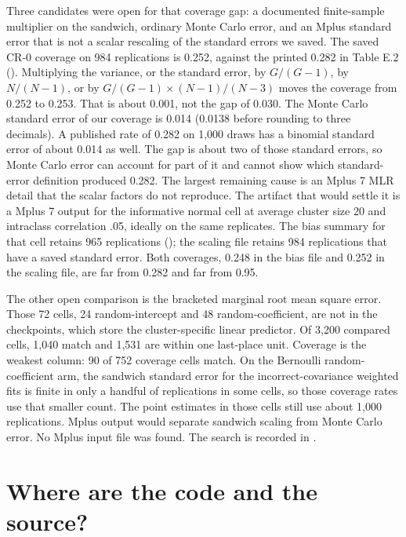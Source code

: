 Three candidates were open for that coverage gap: a documented finite-sample
multiplier on the sandwich, ordinary Monte Carlo error, and an Mplus standard
error that is not a scalar rescaling of the standard errors we saved.
The saved CR-0 coverage on 984 replications is 0.252, against the printed
0.282 in Table E.2
().
Multiplying the variance, or the standard error, by $G/(G-1)$, by
$N/(N-1)$, or by $G/(G-1)\times(N-1)/(N-3)$ moves the coverage from 0.252 to
0.253.
That is about 0.001, not the gap of 0.030.
The Monte Carlo standard error of our coverage is 0.014 (0.0138 before
rounding to three decimals).
A published rate of 0.282 on 1,000 draws has a binomial standard error of
about 0.014 as well.
The gap is about two of those standard errors, so Monte Carlo error can
account for part of it and cannot show which standard-error definition
produced 0.282.
The largest remaining cause is an Mplus 7 MLR detail that the scalar factors
do not reproduce.
The artifact that would settle it is a Mplus 7 output for the informative
normal cell at average cluster size 20 and intraclass correlation .05, ideally
on the same replicates.
The bias summary for that cell retains 965 replications
(); the scaling file retains 984
replications that have a saved standard error.
Both coverages, 0.248 in the bias file and 0.252 in the scaling file, are far
from 0.282 and far from 0.95.

The other open comparison is the bracketed marginal root mean square error.
Those 72 cells, 24 random-intercept and 48 random-coefficient, are not in the
checkpoints, which store the cluster-specific linear predictor.
Of 3,200 compared cells, 1,040 match and 1,531 are within one last-place unit.
Coverage is the weakest column: 90 of 752 coverage cells match.
On the Bernoulli random-coefficient arm, the sandwich standard error for the
incorrect-covariance weighted fits is finite in only a handful of replications
in some cells, so those coverage rates use that smaller count.
The point estimates in those cells still use about 1,000 replications.
Mplus output would separate sandwich scaling from Monte Carlo error.
No Mplus input file was found. The search is recorded in
.

\section{Where are the code and the source?}

